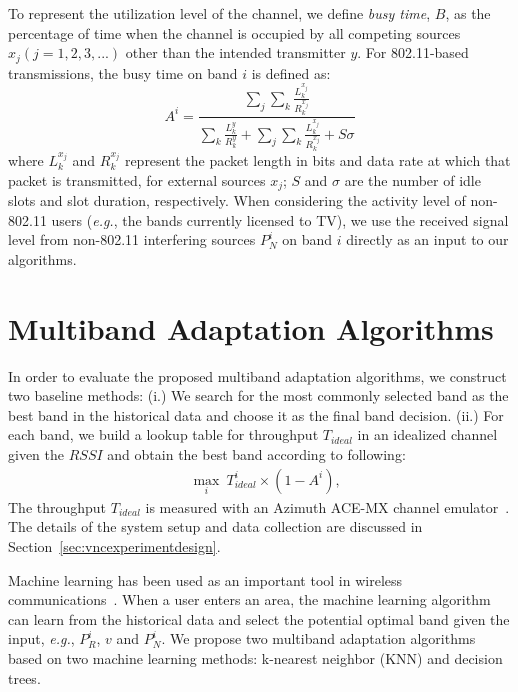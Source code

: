 To represent the utilization level of the channel, we define \emph{busy time}, $B$,
as the percentage of time when the channel is occupied by 
all competing sources $x_j (j = 1, 2, 3, ...)$ other than the intended transmitter $y$. 
For 802.11-based transmissions, the busy time on band $i$ is defined as:
\begin{equation}
\label{eqn:80211activity}
A^i = \frac{\sum_j{\sum_k{\frac{L_k^{x_j}}{R_k^{x_j}}}}}{\sum_k{\frac{L_k^y}{R_k^y}}+\sum_j{\sum_k{\frac{L_k^{x_j}}{R_k^{x_j}}}}+S\sigma}
\end{equation}
where $L_k^{x_j}$ and $R_k^{x_j}$ represent the packet length in bits and data
rate at which that packet is transmitted, for external sources $x_j$;
$S$ and $\sigma$ are the number of idle slots and slot duration, respectively. 
When considering the activity level of non-802.11 users 
({\it e.g.}, the bands currently licensed to TV),
we use the received signal level from non-802.11 interfering sources $P_N^i$ 
on band $i$ directly as an input to our algorithms. 

\section{Multiband Adaptation Algorithms}
\label{subsec:algorithms}

In order to evaluate the proposed multiband adaptation algorithms, 
we construct two baseline methods: (i.) We search for the
most commonly selected band as the best band in the historical data
and choose it as the final band decision. (ii.) For each band, we build 
a lookup table for throughput $T_{ideal}$ in an idealized channel given the $RSSI$ and obtain 
the best band according to following:
\begin{align}
&\max_i\ T_{ideal}^i\times(1-A^i),
\label{eq:baseline2}
\end{align}
The throughput $T_{ideal}$ is measured with an Azimuth ACE-MX channel emulator~\cite{AzimuthACE}. 
The details of the system setup and data collection are discussed in Section~\ref{sec:vncexperimentdesign}. 

Machine learning has been used as an important tool in wireless communications~\cite{haykin2005cognitive}. When a user enters an area, the machine
learning algorithm can learn from the historical data and
select the potential optimal band given the input, {\it e.g.}, $P_R^i$, $v$
and $P_N^i$. We propose two multiband adaptation algorithms based on
two machine learning methods: k-nearest neighbor (KNN) and decision trees.


